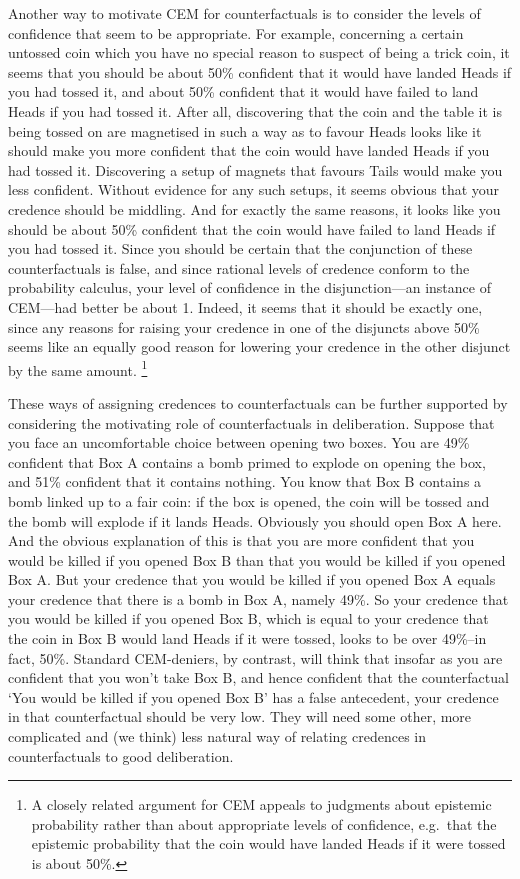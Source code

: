 \documentclass[If.tex]{subfiles}
\begin{document}
Another way to motivate CEM for counterfactuals is to consider the levels of confidence that seem to be appropriate. For example, concerning a certain untossed coin which you have no special reason to suspect of being a trick coin, it seems that you should be about 50\% confident that it would have landed Heads if you had tossed it, and about 50\% confident that it would have failed to land Heads if you had tossed it. After all, discovering that the coin and the table it is being tossed on are magnetised in such a way as to favour Heads looks like it should make you more confident that the coin would have landed Heads if you had tossed it. Discovering a setup of magnets that favours Tails would make you less confident. Without evidence for any such setups, it seems obvious that your credence should be middling. And for exactly the same reasons, it looks like you should be about 50\% confident that the coin would have failed to land Heads if you had tossed it. Since you should be certain that the conjunction of these counterfactuals is false, and since rational levels of credence conform to the probability calculus, your level of confidence in the disjunction---an instance of CEM---had better be about 1.  Indeed, it seems that it should be exactly one, since any reasons for raising your credence in one of the disjuncts above 50\% seems like an equally good reason for lowering your credence in the other disjunct by the same amount.%
\footnote{A closely related argument for CEM appeals to judgments about epistemic probability rather than about appropriate levels of confidence, e.g.~that the epistemic probability that the coin would have landed Heads if it were tossed is about 50\%.}

These ways of assigning credences to counterfactuals can be further supported by considering the motivating role of counterfactuals in deliberation. Suppose that you face an uncomfortable choice between opening two boxes. You are 49\% confident that Box A contains a bomb primed to explode on opening the box, and 51\% confident that it contains nothing. You know that Box B contains a bomb linked up to a fair coin: if the box is opened, the coin will be tossed and the bomb will explode if it lands Heads. Obviously you should open Box A here. And the obvious explanation of this is that you are more confident that you would be killed if you opened Box B than that you would be killed if you opened Box A. But your credence that you would be killed if you opened Box A equals your credence that there is a bomb in Box A, namely 49\%. So your credence that you would be killed if you opened Box B, which is equal to your credence that the coin in Box B would land Heads if it were tossed, looks to be over 49\%--in fact, 50\%. Standard CEM-deniers, by contrast, will think that insofar as you are confident that you won't take Box B, and hence confident that the counterfactual ‘You would be killed if you opened Box B’ has a false antecedent, your credence in that counterfactual should be very low. They will need some other, more complicated and (we think) less natural way of relating credences in counterfactuals to good deliberation.
\end{document}
